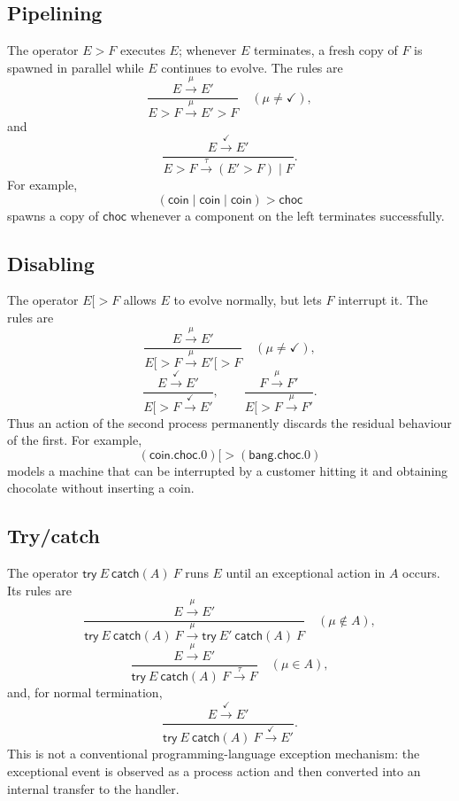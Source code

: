 \documentclass[a4paper]{article}
\newcommand{\tick}{\checkmark}
\newcommand{\trans}[1]{\xrightarrow{#1}}
\begin{document}
\subsection{Pipelining}

The operator \(E>F\) executes \(E\); whenever \(E\) terminates, a fresh copy of \(F\) is spawned in parallel while \(E\) continues to evolve.
The rules are
\[
    \frac{E\trans{\mu}E'}{E>F\trans{\mu}E'>F}
    \quad(\mu\neq\tick),
\]
and
\[
    \frac{E\trans{\tick}E'}{E>F\trans{\tau}(E'>F)\mid F}.
\]
For example,
\[
    (\mathsf{coin}\mid\mathsf{coin}\mid\mathsf{coin})>\mathsf{choc}
\]
spawns a copy of \(\mathsf{choc}\) whenever a component on the left terminates successfully.

\subsection{Disabling}

The operator \(E[>F\) allows \(E\) to evolve normally, but lets \(F\) interrupt it.
The rules are
\[
    \frac{E\trans{\mu}E'}{E[>F\trans{\mu}E'[>F}
    \quad(\mu\neq\tick),
\]
\[
    \frac{E\trans{\tick}E'}{E[>F\trans{\tick}E'},
    \qquad
    \frac{F\trans{\mu}F'}{E[>F\trans{\mu}F'}.
\]
Thus an action of the second process permanently discards the residual behaviour of the first.
For example,
\[
    (\mathsf{coin}.\mathsf{choc}.0)
    [>
    (\mathsf{bang}.\mathsf{choc}.0)
\]
models a machine that can be interrupted by a customer hitting it and obtaining chocolate without inserting a coin.

\subsection{Try/catch}

The operator \(\mathsf{try}\ E\ \mathsf{catch}(A)\ F\) runs \(E\) until an exceptional action in \(A\) occurs.
Its rules are
\[
    \frac{E\trans{\mu}E'}{\mathsf{try}\ E\ \mathsf{catch}(A)\ F
      \trans{\mu}
      \mathsf{try}\ E'\ \mathsf{catch}(A)\ F}
    \quad(\mu\notin A),
\]
\[
    \frac{E\trans{\mu}E'}{\mathsf{try}\ E\ \mathsf{catch}(A)\ F\trans{\tau}F}
    \quad(\mu\in A),
\]
and, for normal termination,
\[
    \frac{E\trans{\tick}E'}{\mathsf{try}\ E\ \mathsf{catch}(A)\ F\trans{\tick}E'}.
\]
This is not a conventional programming-language exception mechanism: the exceptional event is observed as a process action and then converted into an internal transfer to the handler.
\end{document}
